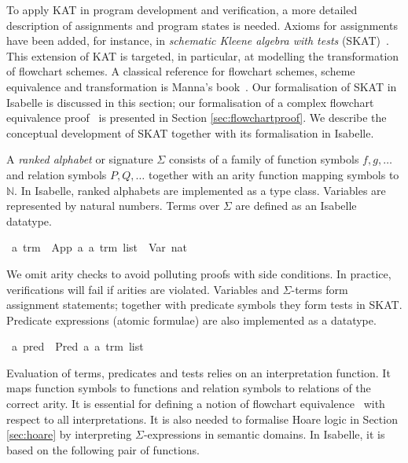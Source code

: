 \documentclass{llncs}
\begin{document}
To apply KAT in program development and verification, a more detailed
description of assignments and program states is needed. Axioms for
assignments have been added, for instance, in \emph{schematic Kleene
  algebra with tests} (SKAT)~\cite{Angus}.  This extension of KAT is
targeted, in particular, at modelling the transformation of flowchart
schemes. A classical reference for flowchart schemes, scheme
equivalence and transformation is Manna's book~\cite{Manna}. Our
formalisation of SKAT in Isabelle is discussed in this section; our
formalisation of a complex flowchart equivalence
proof~\cite{Manna,Angus} is presented in Section
\ref{sec:flowchartproof}.  We describe the conceptual development of
SKAT together with its formalisation in Isabelle.

A \emph{ranked alphabet} or signature $\Sigma$ consists of a family of
function symbols $f,g,\dots$ and relation symbols $P,Q,\dots$ together
with an arity function mapping symbols to $\mathbb{N}$. In Isabelle,
ranked alphabets are implemented as a type class. Variables are
represented by natural numbers. Terms over $\Sigma$ are defined as an
Isabelle datatype.

\begin{isabellebody}
\isanewline
{}\isamarkupfalse%
\ {}a\ trm\ {}\ App\ {}a\ {}{}a\ trm\ list{}\ {}\ Var\ nat\isanewline
\end{isabellebody}

\noindent We omit arity checks to avoid polluting proofs with side
conditions. In practice, verifications will fail if arities are
violated. Variables and $\Sigma$-terms form assignment statements;
together with predicate symbols they form tests in SKAT. Predicate
expressions (atomic formulae) are also implemented as a datatype.

\begin{isabellebody}
\isanewline
{}\isamarkupfalse%
\ {}a\ pred\ {}\ Pred\ {}a\ {}{}a\ trm\ list{}\isanewline
\end{isabellebody}

Evaluation of terms, predicates and tests relies on an interpretation
function. It maps function symbols to functions and relation symbols
to relations of the correct arity. It is essential for defining a
notion of flowchart equivalence~\cite{Angus,Manna} with respect to
all interpretations. It is also needed to formalise Hoare logic in
Section \ref{sec:hoare} by interpreting $\Sigma$-expressions in
semantic domains. In Isabelle, it is based on the following pair of
functions.
\end{document}
